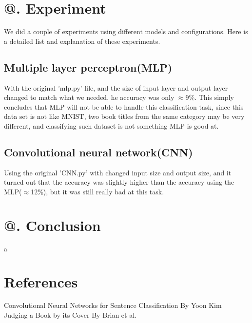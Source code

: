 \documentclass[jou,apacite, 10px]{apa6}
\makeatletter
\newcommand*{\rom}[1]{\expandafter\@slowromancap\romannumeral #1@}
\makeatother
\begin{document}
\section{\rom{5}. Experiment}
We did a couple of experiments using different models and configurations. Here is a detailed list and explanation of these experiments.

\subsection{Multiple layer perceptron(MLP)}
With the original 'mlp.py' file, and the size of input layer and output layer  changed to match what we needed, he accuracy was only $\approx$9\%. This simply concludes that MLP will not be able to handle this classification task, since this data set is not like MNIST, two book titles from the same category may be very different, and classifying such dataset is not something MLP is good at.

\subsection {Convolutional neural network(CNN)}
Using the original 'CNN.py' with changed input size and output size, and it turned out that the accuracy was slightly higher than the accuracy using the MLP($\approx$12\%), but it was still really bad at this task.


\section{\rom{6}. Conclusion}
a
\section{References}
\noindent Convolutional Neural Networks for Sentence Classification By Yoon Kim\\
Judging a Book by its Cover By Brian et al.
\end{document}
